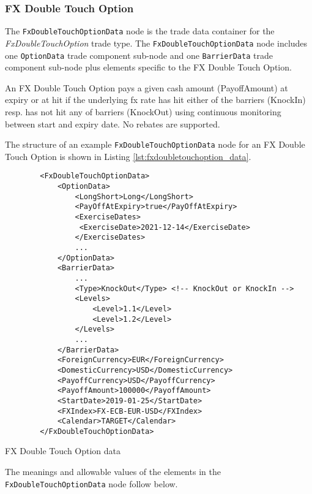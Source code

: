 \subsubsection{FX Double Touch Option}

The \lstinline!FxDoubleTouchOptionData!  node is the trade data container for the \emph{FxDoubleTouchOption} trade type.   The
\lstinline!FxDoubleTouchOptionData!  node includes one  \lstinline!OptionData! trade component sub-node and one \lstinline!BarrierData! trade component sub-node plus elements
specific to the FX Double Touch Option. 

An FX Double Touch Option pays a given cash amount (PayoffAmount) at expiry or at hit if the underlying fx rate has hit either of the barriers (KnockIn) resp. has not hit any of barriers (KnockOut) using continuous monitoring between start and expiry date. No rebates are supported. 

The structure of an example \lstinline!FxDoubleTouchOptionData! node for an FX Double Touch Option is shown in Listing
\ref{lst:fxdoubletouchoption_data}.

\begin{listing}[H]
\begin{verbatim}
        <FxDoubleTouchOptionData>
            <OptionData>
                <LongShort>Long</LongShort>
                <PayOffAtExpiry>true</PayOffAtExpiry>
                <ExerciseDates>
                 <ExerciseDate>2021-12-14</ExerciseDate>
                </ExerciseDates>                     
                ...
            </OptionData>
            <BarrierData>
                ...
                <Type>KnockOut</Type> <!-- KnockOut or KnockIn -->
                <Levels>
                    <Level>1.1</Level>
                    <Level>1.2</Level>
                </Levels>
                ...
            </BarrierData>
            <ForeignCurrency>EUR</ForeignCurrency>
            <DomesticCurrency>USD</DomesticCurrency>
            <PayoffCurrency>USD</PayoffCurrency>
            <PayoffAmount>100000</PayoffAmount>            
            <StartDate>2019-01-25</StartDate>
            <FXIndex>FX-ECB-EUR-USD</FXIndex>            
            <Calendar>TARGET</Calendar>
        </FxDoubleTouchOptionData>
\end{verbatim}
\caption{FX Double Touch Option data}
\label{lst:fxdoubletouchoption_data}
\end{listing}

The meanings and allowable values of the elements in the \lstinline!FxDoubleTouchOptionData!  node follow below.

